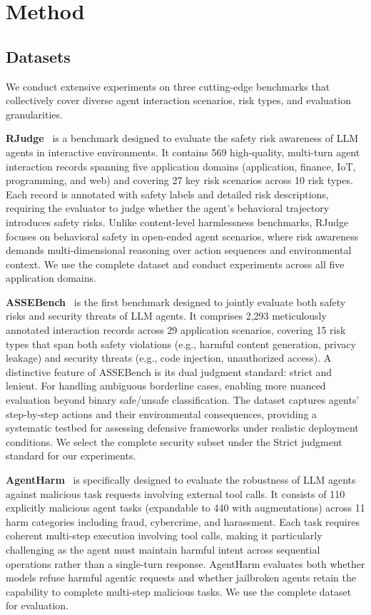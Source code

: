 \section{Method}
  \label{sec:method}

  \subsection{Datasets}
  \label{sec:datasets}
  We conduct extensive experiments on three cutting-edge benchmarks that collectively cover diverse agent interaction scenarios, risk types, and evaluation granularities.

  \textbf{RJudge}~\citep{yuan2024rjudge} is a benchmark designed to evaluate the safety risk awareness of LLM agents in interactive environments. It contains 569 high-quality, multi-turn agent interaction records spanning five application domains (application, finance, IoT, programming, and web) and covering 27 key risk scenarios across 10 risk types. Each record is annotated with safety labels and detailed risk descriptions, requiring the evaluator to judge whether the agent's behavioral trajectory introduces safety risks. Unlike content-level harmlessness benchmarks, RJudge focuses on behavioral safety in open-ended agent scenarios, where risk awareness demands multi-dimensional reasoning over action sequences and environmental context. We use the complete dataset and conduct experiments across all five application domains.

  \textbf{ASSEBench}~\citep{luo2025agentauditor} is the first benchmark designed to jointly evaluate both safety risks and security threats of LLM agents. It comprises 2,293 meticulously annotated interaction records across 29 application scenarios, covering 15 risk types that span both safety violations (e.g., harmful content generation, privacy leakage) and security threats (e.g., code injection, unauthorized access). A distinctive feature of ASSEBench is its dual judgment standard: strict and lenient. For handling ambiguous borderline cases, enabling more nuanced evaluation beyond binary safe/unsafe classification. The dataset captures agents' step-by-step actions and their environmental consequences, providing a systematic testbed for assessing defensive frameworks under realistic deployment conditions. We select the complete security subset under the Strict judgment standard for our experiments.

  \textbf{AgentHarm}~\citep{andriushchenko2025agentharm} is specifically designed to evaluate the robustness of LLM agents against malicious task requests involving external tool calls. It consists of 110 explicitly malicious agent tasks (expandable to 440 with augmentations) across 11 harm categories including fraud, cybercrime, and harassment. Each task requires coherent multi-step execution involving tool calls, making it particularly challenging as the agent must maintain harmful intent across sequential operations rather than a single-turn response. AgentHarm evaluates both whether models refuse harmful agentic requests and whether jailbroken agents retain the capability to complete multi-step malicious tasks. We use the complete dataset for evaluation.

